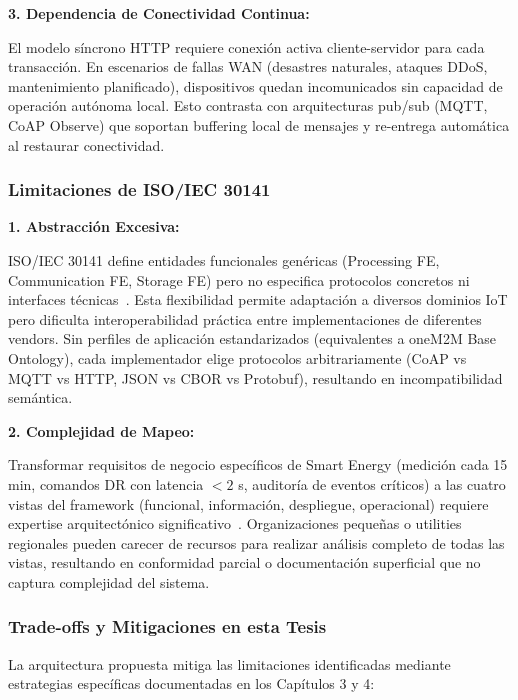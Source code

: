 \textbf{3. Dependencia de Conectividad Continua:}

El modelo síncrono HTTP requiere conexión activa cliente-servidor para cada transacción. En escenarios de fallas WAN (desastres naturales, ataques DDoS, mantenimiento planificado), dispositivos quedan incomunicados sin capacidad de operación autónoma local. Esto contrasta con arquitecturas pub/sub (MQTT, CoAP Observe) que soportan buffering local de mensajes y re-entrega automática al restaurar conectividad.

\subsubsection{Limitaciones de ISO/IEC 30141}

\textbf{1. Abstracción Excesiva:}

ISO/IEC 30141 define entidades funcionales genéricas (Processing FE, Communication FE, Storage FE) pero no especifica protocolos concretos ni interfaces técnicas~\cite{ISOIEC30141v2024}. Esta flexibilidad permite adaptación a diversos dominios IoT pero dificulta interoperabilidad práctica entre implementaciones de diferentes vendors. Sin perfiles de aplicación estandarizados (equivalentes a oneM2M Base Ontology), cada implementador elige protocolos arbitrariamente (CoAP vs MQTT vs HTTP, JSON vs CBOR vs Protobuf), resultando en incompatibilidad semántica.

\textbf{2. Complejidad de Mapeo:}

Transformar requisitos de negocio específicos de Smart Energy (medición cada 15 min, comandos DR con latencia $<2$ s, auditoría de eventos críticos) a las cuatro vistas del framework (funcional, información, despliegue, operacional) requiere expertise arquitectónico significativo~\cite{tangResearchInteroperabilityIoT}. Organizaciones pequeñas o utilities regionales pueden carecer de recursos para realizar análisis completo de todas las vistas, resultando en conformidad parcial o documentación superficial que no captura complejidad del sistema.

\subsubsection{Trade-offs y Mitigaciones en esta Tesis}

La arquitectura propuesta mitiga las limitaciones identificadas mediante estrategias específicas documentadas en los Capítulos 3 y 4:

